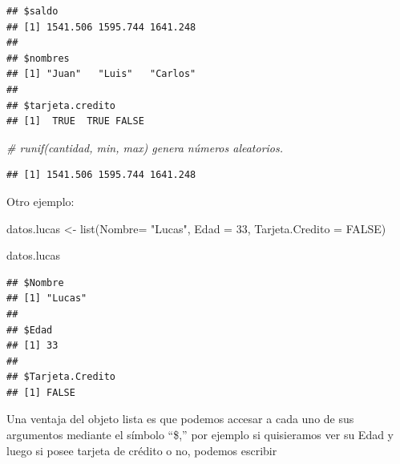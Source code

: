 \documentclass[
  12pt,
]{book}
\newenvironment{Shaded}{\begin{snugshade}}{\end{snugshade}}
\newcommand{\AttributeTok}[1]{\textcolor[rgb]{0.77,0.63,0.00}{#1}}
\newcommand{\CommentTok}[1]{\textcolor[rgb]{0.56,0.35,0.01}{\textit{#1}}}
\newcommand{\ConstantTok}[1]{\textcolor[rgb]{0.00,0.00,0.00}{#1}}
\newcommand{\DecValTok}[1]{\textcolor[rgb]{0.00,0.00,0.81}{#1}}
\newcommand{\FunctionTok}[1]{\textcolor[rgb]{0.00,0.00,0.00}{#1}}
\newcommand{\NormalTok}[1]{#1}
\newcommand{\OtherTok}[1]{\textcolor[rgb]{0.56,0.35,0.01}{#1}}
\newcommand{\SpecialCharTok}[1]{\textcolor[rgb]{0.00,0.00,0.00}{#1}}
\newcommand{\StringTok}[1]{\textcolor[rgb]{0.31,0.60,0.02}{#1}}
\begin{document}
\begin{verbatim}
## $saldo
## [1] 1541.506 1595.744 1641.248
## 
## $nombres
## [1] "Juan"   "Luis"   "Carlos"
## 
## $tarjeta.credito
## [1]  TRUE  TRUE FALSE
\end{verbatim}

\begin{Shaded}
\begin{Highlighting}[]
\CommentTok{\# runif(cantidad, min, max) genera números aleatorios.}
\end{Highlighting}
\end{Shaded}

\begin{Shaded}
\end{Shaded}

\begin{verbatim}
## [1] 1541.506 1595.744 1641.248
\end{verbatim}

Otro ejemplo:

\begin{Shaded}
\begin{Highlighting}[]
\NormalTok{datos.lucas }\OtherTok{\textless{}{-}} \FunctionTok{list}\NormalTok{(}\AttributeTok{Nombre=} \StringTok{"Lucas"}\NormalTok{, }\AttributeTok{Edad =} \DecValTok{33}\NormalTok{, }\AttributeTok{Tarjeta.Credito =} \ConstantTok{FALSE}\NormalTok{)}

\NormalTok{datos.lucas}
\end{Highlighting}
\end{Shaded}

\begin{verbatim}
## $Nombre
## [1] "Lucas"
## 
## $Edad
## [1] 33
## 
## $Tarjeta.Credito
## [1] FALSE
\end{verbatim}

Una ventaja del objeto lista es que podemos accesar a cada uno de sus argumentos mediante el símbolo ``\$,'' por ejemplo si quisieramos ver su Edad y luego si posee tarjeta de crédito o no, podemos escribir

\begin{Shaded}
\end{Shaded}
\end{document}
